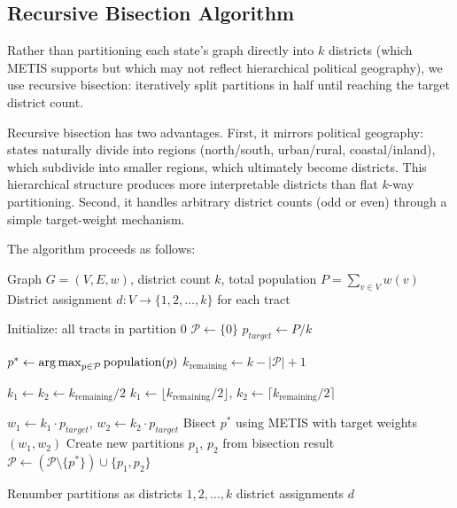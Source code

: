 \subsection{Recursive Bisection Algorithm}

Rather than partitioning each state's graph directly into $k$ districts (which METIS supports but which may not reflect hierarchical political geography), we use recursive bisection: iteratively split partitions in half until reaching the target district count.

Recursive bisection has two advantages. First, it mirrors political geography: states naturally divide into regions (north/south, urban/rural, coastal/inland), which subdivide into smaller regions, which ultimately become districts. This hierarchical structure produces more interpretable districts than flat $k$-way partitioning. Second, it handles arbitrary district counts (odd or even) through a simple target-weight mechanism.

The algorithm proceeds as follows:

\begin{algorithm}[H]
\caption{Recursive Bisection Redistricting}
\label{alg:recursive_bisection}
\begin{algorithmic}[1]
\Require Graph $G = (V, E, w)$, district count $k$, total population $P = \sum_{v \in V} w(v)$
\Ensure District assignment $d: V \to \{1, 2, \ldots, k\}$ for each tract

\State Initialize: all tracts in partition 0
\State $\mathcal{P} \gets \{0\}$ 
\State $p_{target} \gets P / k$ 

    \State $p^* \gets \operatorname*{arg\,max}_{p \in \mathcal{P}} \text{population}(p)$ 
    \State $k_{\text{remaining}} \gets k - |\mathcal{P}| + 1$ 

        \State $k_1 \gets k_2 \gets k_{\text{remaining}} / 2$ 
    \Else
        \State $k_1 \gets \lfloor k_{\text{remaining}} / 2 \rfloor$, $k_2 \gets \lceil k_{\text{remaining}} / 2 \rceil$ 
    \EndIf

    \State $w_1 \gets k_1 \cdot p_{target}$, $w_2 \gets k_2 \cdot p_{target}$ 
    \State Bisect $p^*$ using METIS with target weights $(w_1, w_2)$
    \State Create new partitions $p_1$, $p_2$ from bisection result
    \State $\mathcal{P} \gets (\mathcal{P} \setminus \{p^*\}) \cup \{p_1, p_2\}$
\EndWhile

\State Renumber partitions as districts $1, 2, \ldots, k$
\State \Return district assignments $d$
\end{algorithmic}
\end{algorithm}

